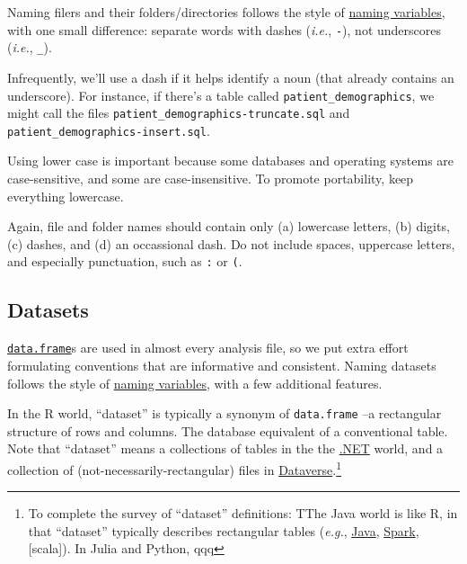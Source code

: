 \documentclass[
]{book}
\begin{document}
Naming filers and their folders/directories follows the style of \protect\hyperlink{style-naming-variables}{naming variables}, with one small difference: separate words with dashes (\emph{i.e.}, \texttt{-}), not underscores (\emph{i.e.}, \texttt{\_}).

Infrequently, we'll use a dash if it helps identify a noun (that already contains an underscore). For instance, if there's a table called \texttt{patient\_demographics}, we might call the files \texttt{patient\_demographics-truncate.sql} and \texttt{patient\_demographics-insert.sql}.

Using lower case is important because some databases and operating systems are case-sensitive, and some are case-insensitive. To promote portability, keep everything lowercase.

Again, file and folder names should contain only (a) lowercase letters, (b) digits, (c) dashes, and (d) an occassional dash. Do not include spaces, uppercase letters, and especially punctuation, such as \texttt{:} or \texttt{(}.

\hypertarget{style-naming-datasets}{%
\subsection{Datasets}\label{style-naming-datasets}}

\href{https://stat.ethz.ch/R-manual/R-devel/library/base/html/data.frame.html}{\texttt{data.frame}}s are used in almost every analysis file, so we put extra effort formulating conventions that are informative and consistent. Naming datasets follows the style of \protect\hyperlink{style-naming-variables}{naming variables}, with a few additional features.

In the R world, ``dataset'' is typically a synonym of \texttt{data.frame} --a rectangular structure of rows and columns. The database equivalent of a conventional table. Note that ``dataset'' means a collections of tables in the the \href{https://docs.microsoft.com/en-us/dotnet/framework/data/adonet/dataset-datatable-dataview/}{.NET} world, and a collection of (not-necessarily-rectangular) files in \href{https://dataverse.harvard.edu}{Dataverse}.\footnote{To complete the survey of ``dataset'' definitions: TThe Java world is like R, in that ``dataset'' typically describes rectangular tables (\emph{e.g.}, \href{https://docs.oracle.com/cd/E17802_01/j2se/javase/6/jcp/beta/apidiffs/java/sql/DataSet.html}{Java}, \href{https://spark.apache.org/docs/latest/api/java/org/apache/spark/sql/Dataset.html}{Spark}, {[}scala{]}). In Julia and Python, qqq}
\end{document}
